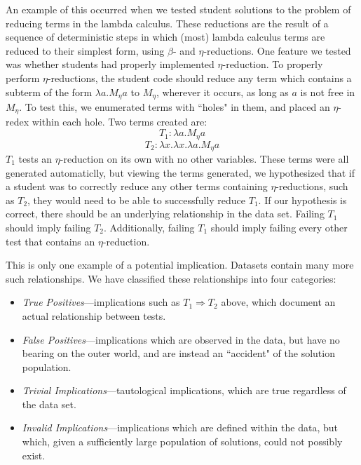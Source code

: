 \documentclass[11pt,twoside]{article}
\theoremstyle{definition}
\begin{document}
An example of this occurred when we tested student solutions to the problem of reducing terms in the lambda calculus. These reductions are the result of a sequence of deterministic steps in which (most) lambda calculus terms are reduced to their simplest form, using $\beta$- and $\eta$-reductions. One feature we tested was whether students had properly implemented $\eta$-reduction. To properly perform $\eta$-reductions, the student code should reduce any term which contains a subterm of the form $\lambda a.M_\eta a$ to $M_\eta$, wherever it occurs, as long as $a$ is not free in $M_\eta$. To test this, we enumerated terms with ``holes" in them, and placed an $\eta$-redex within each hole. Two terms created are: 
$$T_1 : \lambda a.M_\eta a$$
$$T_2 : \lambda x.\lambda x.\lambda a.M_\eta a$$
$T_1$ tests an $\eta$-reduction on its own with no other variables. These terms were all generated automaticlly, but viewing the terms generated, we hypothesized that if a student was to correctly reduce any other terms containing $\eta$-reductions, such as $T_2$, they would need to be able to successfully reduce $T_1$.
If our hypothesis is correct, there should be an underlying relationship in the data set. Failing $T_1$ should imply failing $T_2$. Additionally, failing $T_1$ should imply failing every other test that contains an $\eta$-reduction.

This is only one example of a potential implication. Datasets contain many more such relationships. We have classified these relationships into four categories:
\begin{itemize}
\item \emph{True Positives}---implications such as $T_1 \Rightarrow T_2$ above, which document an actual relationship between tests. 
\item \emph{False Positives}---implications which are observed in the data, but have no bearing on the outer world, and are instead an ``accident" of the solution population. 
\item \emph{Trivial Implications}---tautological implications, which are true regardless of the data set. 
\item \emph{Invalid Implications}---implications which are defined within the data, but which, given a sufficiently large population of solutions, could not possibly exist.
\end{itemize}

\end{document}

